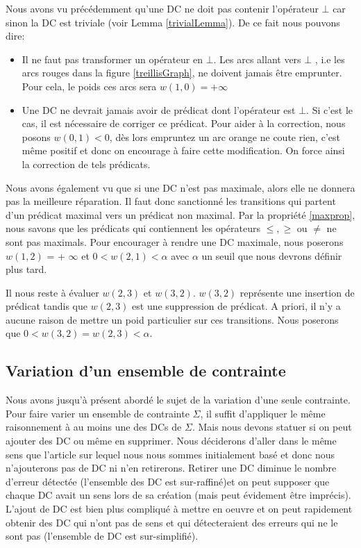 \documentclass[letterpaper, 12pt]{report}
\theoremstyle{definition}
\begin{document}
Nous avons vu précédemment qu'une DC ne doit pas contenir l'opérateur $\bot$ car sinon la DC est triviale (voir Lemma \ref{trivialLemma}). De ce fait nous pouvons dire:

\begin{itemize}
	\item Il ne faut pas transformer un opérateur en $\bot$. Les arcs allant vers $\bot$ , i.e les arcs rouges dans la figure \ref{treillisGraph}, ne doivent jamais être emprunter. Pour cela, le poids ces arcs sera $w(1,0)= + \infty$
	\item Une DC ne devrait jamais avoir de prédicat dont l'opérateur est $\bot$. Si c'est le cas, il est nécessaire de corriger ce prédicat. Pour aider à la correction, nous posons $w(0,1) < 0$, dès lors empruntez un arc orange ne coute rien, c'est même positif et donc on encourage à faire cette modification. On force ainsi la correction de tels prédicats.
\end{itemize}

Nous avons également vu que si une DC n'est pas maximale, alors elle ne donnera pas la meilleure réparation. Il faut donc sanctionné les transitions qui partent d'un prédicat maximal vers un prédicat non maximal. Par la propriété \ref{maxprop}, nous savons que les prédicats qui contiennent les opérateurs $\leq, \geq$ ou $\neq$ ne sont pas maximals. Pour encourager à rendre une DC maximale, nous poserons $w(1,2)$ = + $\infty$ et $0 < w(2,1) <\alpha$ avec $\alpha$ un seuil que nous devrons définir plus tard.

Il nous reste à évaluer $w(2,3)$ et $w(3,2)$. $w(3,2)$ représente une insertion de prédicat tandis que $w(2,3)$ est une suppression de prédicat. A priori, il n'y a aucune raison de mettre un poid particulier sur ces transitions. Nous poserons que $0 < w(3,2)  = w(2,3) < \alpha$.

\subsection{Variation d'un ensemble de contrainte}

Nous avons jusqu'à présent abordé le sujet de la variation d'une seule contrainte. Pour faire varier un ensemble de contrainte $\Sigma$, il suffit d'appliquer le même raisonnement à au moins une des DCs de $\Sigma$. Mais nous devons statuer si on peut ajouter des DC ou même en supprimer. Nous déciderons d'aller dans le même sens que l'article sur lequel nous nous sommes initialement basé \cite{bcss} et donc nous n'ajouterons pas de DC ni n'en retirerons. Retirer une DC diminue le nombre d'erreur détectée (l'ensemble des DC est sur-raffiné)et on peut supposer que chaque DC avait un sens lors de sa création (mais peut évidement être imprécis). L'ajout de DC est bien plus compliqué à mettre en oeuvre et on peut rapidement obtenir des DC qui n'ont pas de sens et qui détecteraient des erreurs qui ne le sont pas (l'ensemble de DC est sur-simplifié).
\end{document}
